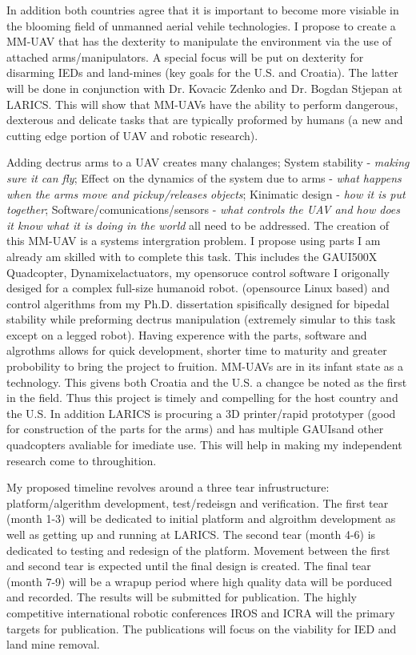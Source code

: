 \documentclass[12pt]{article}
\begin{document}
In addition both countries agree that it is important to become more visiable in the blooming field of unmanned aerial vehile technologies.
I propose to create a MM-UAV that has the dexterity to manipulate the environment via the use of attached  arms/manipulators. 
A special focus will be put on dexterity for disarming IEDs and land-mines (key goals for the U.S. and Croatia).  
The latter will be done in conjunction with Dr. Kovacic Zdenko and Dr. Bogdan Stjepan at LARICS.  
This will show that MM-UAVs have the ability to perform dangerous, dexterous and delicate tasks that are typically proformed by humans (a new and cutting edge portion of UAV and robotic research).

Adding dectrus arms to a UAV creates many chalanges; 
System stability -  \textit{making sure it can fly};
Effect on the dynamics of the system due to arms - \textit{what happens when the arms move and pickup/releases objects};
Kinimatic design -  \textit{how it is put together};
Software/comunications/sensors -  \textit{what controls the UAV and how does it know what it is doing in the world} all need to be addressed.  
The creation of this MM-UAV is a systems intergration problem.  
I propose using parts I am already am skilled with to complete this task.
This includes the GAUI\texttrademark 500X Quadcopter, Dynamixel\texttrademark actuators, my opensoruce control software I origonally desiged for a complex full-size humanoid robot.
(opensource Linux based) and control algerithms from my Ph.D. dissertation spisifically designed for bipedal stability while preforming dectrus manipulation (extremely simular to this task except on a legged robot).  
Having experence with the parts, software and algrothms allows for quick development, shorter time to maturity and greater probobility to bring the project to fruition.  
MM-UAVs are in its infant state as a technology.
This givens both Croatia and the U.S. a changce be noted as the first in the field.
Thus this project is timely and compelling for the host country and the U.S.  
In addition LARICS is procuring a 3D printer/rapid prototyper (good for construction of the parts for the arms) and has multiple GAUIs\texttrademark and other quadcopters avaliable for imediate use.  This will help in making my independent research come to throughition.

My proposed timeline revolves around a three tear infrustructure: platform/algerithm development, test/redeisgn and verification.  
The first tear (month 1-3) will be dedicated to initial platform and algroithm development as well as getting up and running at LARICS.  
The second tear (month 4-6) is dedicated to testing and redesign of the platform.  
Movement between the first and second tear is expected until the final design is created.
The final tear (month 7-9) will be a wrapup period where high quality data will be porduced and recorded.
The results will be submitted for publication.  
The highly competitive international robotic conferences IROS and ICRA will the primary targets for publication.  
The publications will focus on the viability for IED and land mine removal.
\end{document}
